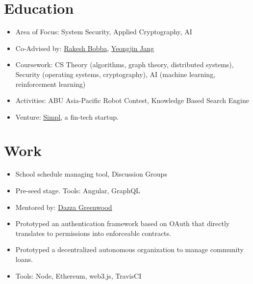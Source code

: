 \documentclass[11pt,a4paper,sans]{moderncv}
\begin{document}
\section{Education}
{
    \begin{itemize}
    \item Area of Focus: System Security, Applied Cryptography, AI
    \item Co-Advised by:
    \href{https://eecs.oregonstate.edu/people/bobba-rakesh}{Rakesh Bobba},
    \href{https://www.unexploitable.systems/}{Yeongjin Jang}
    \item Coursework: CS Theory (algorithms, graph theory, distributed systems),
    Security (operating systems, cryptography), AI (machine
    learning, reinforcement learning)
    \end{itemize}
}
{
    \begin{itemize}
    \item Activities: ABU Asia-Pacific Robot Contest, Knowledge Based Search
    Engine
    \item Venture: \href{https://www.getsimpl.com}{Simpl}, a fin-tech startup.
    \end{itemize}
}

\section{Work}
{
    \begin{itemize}
        \item School schedule managing tool, Discussion Groups
        \item Pre-seed stage. Tools: Angular, GraphQL
    \end{itemize}
}

{
    \begin{itemize}
    \item Mentored by: \href{https://web.media.mit.edu/~dang/}{Dazza Greenwood}
    \item Prototyped an authentication framework based on OAuth that directly
    translates to permissions into enforceable contracts.
    \item Prototyped a decentralized autonomous organization to manage community
        loans.
    \item Tools: Node, Ethereum, web3.js, TravisCI
    \end{itemize}
}
\end{document}
